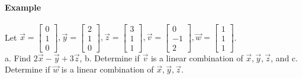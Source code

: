 \paragraph*{Example} Let $\vec{x} = \begin{bmatrix} 0 \\ 1 \\ 0 \end{bmatrix}, \vec{y} = \begin{bmatrix} 2 \\ 1 \\ 0 \end{bmatrix},
\vec{z} = \begin{bmatrix} 3 \\ 1 \\ 1 \end{bmatrix}, \vec{v} = \begin{bmatrix} 0 \\ -1 \\ 2 \end{bmatrix}, \vec{w} = \begin{bmatrix}
1 \\ 1 \\ 1 \end{bmatrix}$. \\ a. Find $2\vec{x} -\vec{y} + 3\vec{z}$, b. Determine if $\vec{v}$ is a linear combination
of $\vec{x}, \vec{y}, \vec{z}$, and c. Determine if $\vec{w}$ is a linear combination of $\vec{x}, \vec{y}, \vec{z}$.

